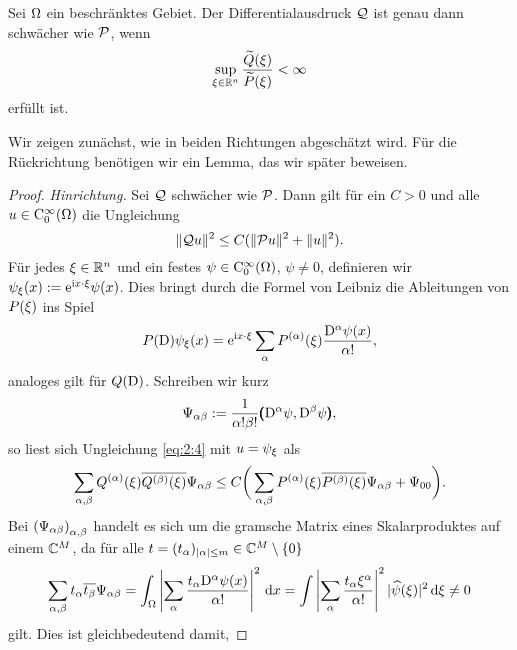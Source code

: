 \begin{thm}\label{thm:2:2.1}
Sei $\Omega$ ein beschränktes Gebiet.
Der Differentialausdruck $\mathcal Q$ ist genau dann schwächer wie $\mathcal P$,
wenn
\begin{equation}\label{eq:thm:2:2.1}
\sup_{\xi\in\mathbb R^n}\frac{\widetilde{Q}(\xi)}{\widetilde{P}(\xi)}<\infty
\end{equation}
erfüllt ist.
\end{thm}

Wir zeigen zunächst, wie in beiden Richtungen abgeschätzt wird.
Für die Rückrichtung benötigen wir ein Lemma,
das wir später beweisen.

\begin{proof}
{\em Hinrichtung.}
Sei $\mathcal Q$ schwächer wie $\mathcal P$.
Dann gilt für ein $C>0$ und alle $u\in\mathrm C_0^\infty(\Omega)$ die Ungleichung
\begin{equation}\label{eq:2:4}
\lVert\mathcal Q u\rVert^2\leq C(\lVert\mathcal P u\rVert^2+\lVert u\rVert^2).
\end{equation}
Für jedes $\xi\in\mathbb R^n$ und ein festes $\psi\in \mathrm C^\infty_0(\Omega)$, $\psi\neq0$,
definieren wir $\psi_\xi(x):=\mathrm e^{\mathrm i x\cdot\xi}\psi(x)$.
Dies bringt durch die Formel von Leibniz die Ableitungen von $P(\xi)$ ins Spiel
\begin{equation}\label{eq:2.5}
P(\mathrm D)\psi_\xi(x)=\mathrm e^{\mathrm i x\cdot\xi}\sum_\alpha P^{(\alpha)}(\xi)\frac{\mathrm D^\alpha\psi(x)}{\alpha!},
\end{equation}
analoges gilt für $Q(\mathrm D)$.
Schreiben wir kurz
\begin{equation}\label{eq:2.6}
\Psi_{\alpha\beta}:=\frac1{\alpha!\beta!}\pmb(\mathrm D^\alpha\psi,\mathrm D^\beta\psi\pmb),
\end{equation}
so liest sich Ungleichung \eqref{eq:2:4} mit $u=\psi_\xi$ als
\begin{equation}\label{eq:2.7}
\sum_{\alpha,\beta}Q^{(\alpha)}(\xi)\overline{{Q}^{(\beta)}(\xi)}\Psi_{\alpha\beta}
\leq C\bigg(\sum_{\alpha,\beta}P^{(\alpha)}(\xi)\overline{{P}^{(\beta)}(\xi)}\Psi_{\alpha\beta}+\Psi_{00}\bigg).
\end{equation}
Bei $\left(\Psi_{\alpha\beta}\right)_{\alpha,\beta}$ handelt es sich um die gramsche Matrix
eines Skalarproduktes auf einem $\mathbb C^M$, da für alle $t=(t_\alpha)_{|\alpha|\le m}\in\mathbb C^M\setminus\{0\}$
\begin{equation}
  \sum_{\alpha,\beta} t_\alpha \overline{t_\beta} \Psi_{\alpha\beta} = \int_\Omega \left|\sum_\alpha \frac{t_\alpha \mathrm D^\alpha\psi (x)}{\alpha! }\right|^2 \,\mathrm d x 
  = \int \left|\sum_\alpha \frac{t_\alpha \xi^\alpha}{\alpha!} \right|^2 |\widehat\psi(\xi)|^2 \,\mathrm d\xi \ne0
\end{equation}
gilt.
Dies ist gleichbedeutend damit,

\end{proof}
